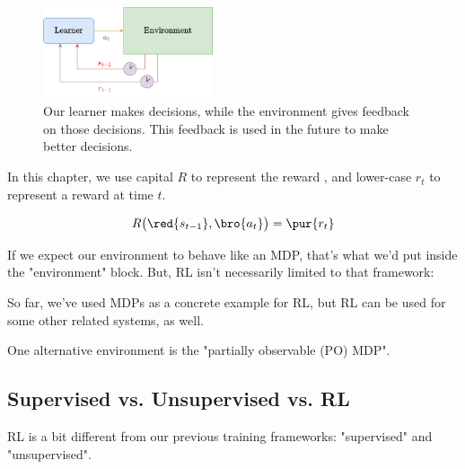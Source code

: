         \begin{figure}[H]
            \centering
            \includegraphics[width=50mm,scale=0.5]{images/rl_images/learner_environment.png}
            \caption*{Our learner makes decisions, while the environment gives feedback on those decisions. This feedback is used in the future to make better decisions.}
        \end{figure}

        \begin{notation}
            In this chapter, we use capital $R$ to represent the reward , and lower-case $r_t$ to represent a  reward at time $t$.

            \begin{equation*}
                R \big( \red{s_{t-1}},\bro{a_t} \big) =\pur{r_t}
            \end{equation*}
        \end{notation}

        

        If we expect our environment to behave like an MDP, that's what we'd put inside the "environment" block. But, RL isn't necessarily limited to that framework:\\


        \begin{clarification}
            So far, we've used MDPs as a concrete example for RL, but RL can be used for some other related systems, as well.
        \end{clarification}

        \miniex One alternative environment is the "partially observable (PO) MDP". 




    \phantom{}

    \subsection{Supervised vs. Unsupervised vs. RL}

        RL is a bit different from our previous training frameworks: "supervised" and "unsupervised".

